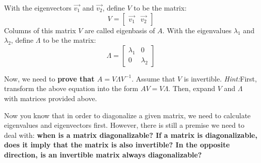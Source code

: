 With the eigenvectors $\vec{v_1}$ and $\vec{v_2}$, define $V$ to be the matrix:
$$V = \begin{bmatrix}
\vec{v_1} & \vec{v_2}
\end{bmatrix}$$
Columns of this matrix $V$ are called eigenbasis of $A$.
With the eigenvalues ${\lambda}_1$ and ${\lambda}_2$, define $\Lambda$ to be the matrix:
$$\Lambda = \begin{bmatrix}
  {\lambda}_1 & 0\\
  0 & {\lambda}_2
  \end{bmatrix}$$
\begin{enumerate}[resume]
\qitem Now, we need to \textbf{prove that $A=V{\Lambda}V^{-1}$}. Assume that $V$ is invertible.
\newline \emph{Hint:}First, transform the above equation into the form $AV=V{\Lambda}$. Then, expand $V$ and $\Lambda$ with
matrices provided above.
\ws{\vspace{100px}}


\qitem Now you know that in order to diagonalize a given matrix, we need to calculate eigenvalues and eigenvectors first. However, there is still a premise we need to deal with: \textbf{when is a matrix diagonalizable?
If a matrix is diagonalizable, does it imply that the matrix is also invertible? In the opposite direction, is an invertible matrix always diagonalizable?}
\ws{\vspace{40px}}



\end{enumerate}

